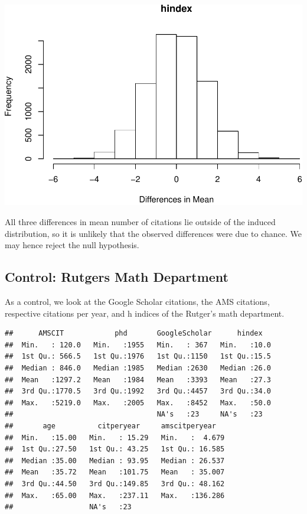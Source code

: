 \documentclass[]{article}
\begin{document}
\includegraphics{final_files/figure-latex/unnamed-chunk-47-1.pdf}

All three differences in mean number of citations lie outside of the
induced distribution, so it is unlikely that the observed differences
were due to chance. We may hence reject the null hypothesis.

\hypertarget{control-rutgers-math-department}{%
\subsection{Control: Rutgers Math
Department}\label{control-rutgers-math-department}}

As a control, we look at the Google Scholar citations, the AMS
citations, respective citations per year, and h indices of the Rutger's
math department.

\begin{verbatim}
##      AMSCIT            phd       GoogleScholar      hindex    
##  Min.   : 120.0   Min.   :1955   Min.   : 367   Min.   :10.0  
##  1st Qu.: 566.5   1st Qu.:1976   1st Qu.:1150   1st Qu.:15.5  
##  Median : 846.0   Median :1985   Median :2630   Median :26.0  
##  Mean   :1297.2   Mean   :1984   Mean   :3393   Mean   :27.3  
##  3rd Qu.:1770.5   3rd Qu.:1992   3rd Qu.:4457   3rd Qu.:34.0  
##  Max.   :5219.0   Max.   :2005   Max.   :8452   Max.   :50.0  
##                                  NA's   :23     NA's   :23    
##       age          citperyear     amscitperyear    
##  Min.   :15.00   Min.   : 15.29   Min.   :  4.679  
##  1st Qu.:27.50   1st Qu.: 43.25   1st Qu.: 16.585  
##  Median :35.00   Median : 93.95   Median : 26.537  
##  Mean   :35.72   Mean   :101.75   Mean   : 35.007  
##  3rd Qu.:44.50   3rd Qu.:149.85   3rd Qu.: 48.162  
##  Max.   :65.00   Max.   :237.11   Max.   :136.286  
##                  NA's   :23
\end{verbatim}
\end{document}
